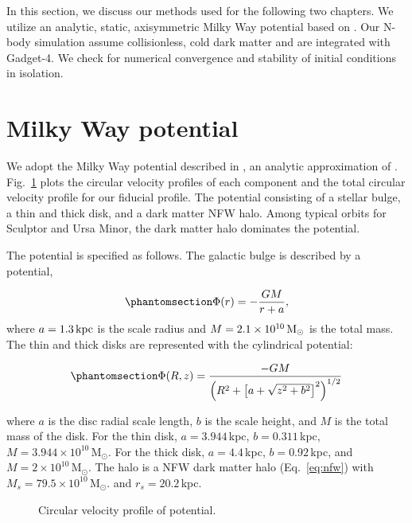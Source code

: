 In this section, we discuss our methods used for the following two
chapters. We utilize an analytic, static, axisymmetric Milky Way
potential based on \citet{mcmillan2011}. Our N-body simulation assume
collisionless, cold dark matter and are integrated with Gadget-4. We
check for numerical convergence and stability of initial conditions in
isolation.

\section{Milky Way potential}\label{milky-way-potential}

We adopt the Milky Way potential described in \citet{EP2020}, an
analytic approximation of \citet{mcmillan2011}.
Fig.~\ref{fig:v_circ_potential} plots the circular velocity profiles of
each component and the total circular velocity profile for our fiducial
profile. The potential consisting of a stellar bulge, a thin and thick
disk, and a dark matter NFW halo. Among typical orbits for Sculptor and
Ursa Minor, the dark matter halo dominates the potential.

The potential is specified as follows. The galactic bulge is described
by a \citet{hernquist1990} potential,

\begin{equation}\protect\phantomsection\label{eq:hernquist}{
\Phi(r) = - \frac{GM}{r + a},
}\end{equation} where \(a=1.3\,{\rm kpc}\) is the scale radius and
\(M=2.1 \times 10^{10}\,{\rm M}_{\odot}\) is the total mass. The thin and thick
disks are represented with the \citet{miyamoto+nagai1975} cylindrical
potential:

\begin{equation}\protect\phantomsection\label{eq:mn75}{
\Phi(R, z) = \frac{-GM}{\left(R^2 + \left[a + \sqrt{z^2 + b^2}\right]^{2}\right)^{1/2}}
}\end{equation}

where \(a\) is the disc radial scale length, \(b\) is the scale height,
and \(M\) is the total mass of the disk. For the thin disk,
\(a=3.944\,\)kpc, \(b=0.311\,\)kpc,
\(M=3.944\times10^{10}\,\)M\(_\odot\). For the thick disk,
\(a=4.4\,\)kpc, \(b=0.92\,\)kpc, and \(M=2\times10^{10}\,\)M\(_\odot\).
The halo is a NFW dark matter halo (Eq.~\ref{eq:nfw}) with
\(M_s=79.5\times10^{10}\,\)M\(_\odot\). and \(r_s = 20.2\,\)kpc.

\begin{figure}
\centering
{}
\caption[Circular velocity of potential]{Circular velocity profile of
\citet{EP2020} potential.}\label{fig:v_circ_potential}
\end{figure}

